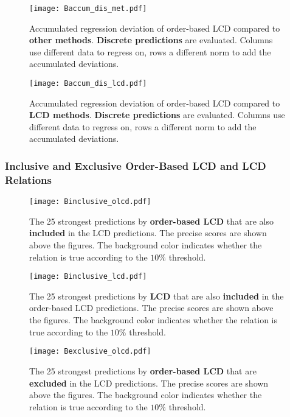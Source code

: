 \begin{figure}[H]
    \centering
    \texttt{[image: Baccum\_dis\_met.pdf]}
    \caption{Accumulated regression deviation of order-based LCD compared to \textbf{other methods}. \textbf{Discrete predictions} are evaluated. Columns use different data to regress on, rows a different norm to add the accumulated deviations.}
\end{figure}

\begin{figure}[H]
    \centering
    \texttt{[image: Baccum\_dis\_lcd.pdf]}
    \caption{Accumulated regression deviation of order-based LCD compared to \textbf{LCD methods}. \textbf{Discrete predictions} are evaluated. Columns use different data to regress on, rows a different norm to add the accumulated deviations.}
\end{figure}


\subsubsection{Inclusive and Exclusive Order-Based LCD and LCD Relations}

\begin{figure}[H]
    \centering
    \texttt{[image: Binclusive\_olcd.pdf]}
    \caption{The 25 strongest predictions by \textbf{order-based LCD} that are also \textbf{included} in the LCD predictions. The precise scores are shown above the figures. The background color indicates whether the relation is true according to the $10\%$ threshold.}
\end{figure}

\begin{figure}[H]
    \centering
    \texttt{[image: Binclusive\_lcd.pdf]}
    \caption{The 25 strongest predictions by \textbf{LCD} that are also \textbf{included} in the order-based LCD predictions. The precise scores are shown above the figures. The background color indicates whether the relation is true according to the $10\%$ threshold.}
\end{figure}

\begin{figure}[H]
    \centering
    \texttt{[image: Bexclusive\_olcd.pdf]}
    \caption{The 25 strongest predictions by \textbf{order-based LCD} that are \textbf{excluded} in the LCD predictions. The precise scores are shown above the figures. The background color indicates whether the relation is true according to the $10\%$ threshold.}
\end{figure}

